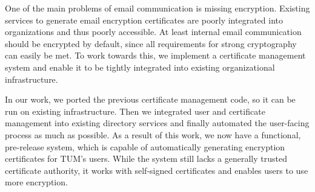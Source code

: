 \small

One of the main problems of email communication is missing encryption.
Existing services to generate email encryption certificates are poorly integrated into organizations and thus poorly
accessible.
At least internal email communication should be encrypted by default, since all requirements for strong cryptography can
easily be met.
To work towards this, we implement a certificate management system and enable it to be tightly integrated into existing
organizational infrastructure.

In our work, we ported the previous certificate management code, so it can be run on existing infrastructure.
Then we integrated user and certificate management into existing directory services and finally automated the
user-facing process as much as possible.
As a result of this work, we now have a functional, pre-release system, which is capable of automatically generating
encryption certificates for TUM's users.
While the system still lacks a generally trusted certificate authority, it works with self-signed certificates and
enables users to use more encryption.
